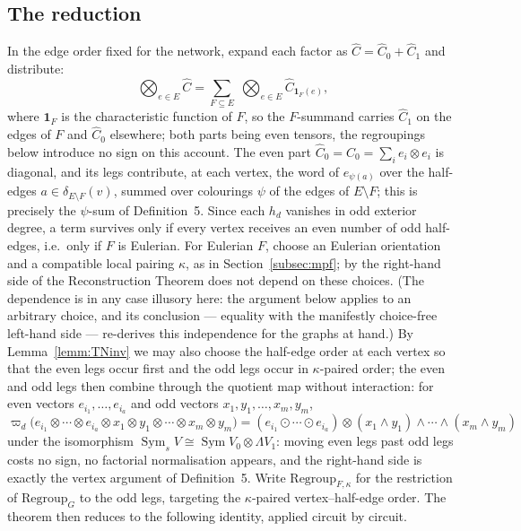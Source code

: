 \documentclass[11pt]{article}
\newcommand{\halfedges}[2]{\delta_{#1}(#2)}       %
\newcommand{\copair}{C}                           %
\newcommand{\twistedC}{\widehat{C}}               %
\newcommand{\symq}[1]{\varpi_{#1}}                %
\newcommand{\SymV}{\operatorname{Sym}}
\begin{document}
\subsection{The reduction}\label{subsec:reduction}

In the edge order fixed for the network, expand each factor as
$\twistedC=\twistedC_{0}+\twistedC_{1}$ and distribute:
\[
\bigotimes_{e\in E}\twistedC
=\sum_{F\subseteq E}\;
\bigotimes_{e\in E}\twistedC_{\mathbf{1}_{F}(e)},
\]
where $\mathbf{1}_{F}$ is the characteristic function of $F$, so
the $F$-summand carries $\twistedC_{1}$ on the edges of $F$ and
$\twistedC_{0}$ elsewhere; both parts being even tensors, the
regroupings below introduce no sign on this account.
The even part $\twistedC_{0}=\copair_{0}=\sum_{i}e_{i}\otimes
e_{i}$ is diagonal, and its legs contribute, at each vertex, the
word of $e_{\psi(a)}$ over the half-edges
$a\in\halfedges{E\setminus F}{v}$, summed over colourings $\psi$
of the edges of $E\setminus F$; this is precisely the
$\psi$-sum of Definition~5. Since each $h_{d}$ vanishes in odd
exterior degree, a term survives only if every vertex receives an
even number of odd half-edges, i.e.\ only if $F$ is Eulerian.
For Eulerian $F$, choose an Eulerian orientation and a compatible
local pairing $\kappa$, as in
Section~\ref{subsec:mpf}; by \cite[Proposition~3]{RS21} the
right-hand side of the Reconstruction Theorem does not depend on
these choices. (The dependence is in any case illusory here: the
argument below applies to an arbitrary choice, and its conclusion
--- equality with the manifestly choice-free left-hand side ---
re-derives this independence for the graphs at hand.) By Lemma~\ref{lemm:TNinv} we may also choose the
half-edge order at each vertex so that the even legs occur first
and the odd legs occur in $\kappa$-paired order; the even and odd
legs then combine through the quotient map without interaction:
for even vectors $e_{i_{1}},\dotsc,e_{i_{a}}$ and odd vectors
$x_{1},y_{1},\dotsc,x_{m},y_{m}$,
\begin{equation}\label{eq:mixedquotient}
\symq{d}\bigl(e_{i_{1}}\otimes\dotsb\otimes e_{i_{a}}
\otimes x_{1}\otimes y_{1}\otimes\dotsb\otimes x_{m}\otimes
y_{m}\bigr)
=(e_{i_{1}}\odot\dotsb\odot e_{i_{a}})\otimes
(x_{1}\wedge y_{1})\wedge\dotsb\wedge(x_{m}\wedge y_{m})
\end{equation}
under the isomorphism
$\SymV_{s}V\cong\SymV V_{0}\otimes\Lambda V_{1}$: moving even legs
past odd legs costs no sign, no factorial normalisation appears,
and the right-hand side is exactly the vertex argument of
Definition~5. Write $\mathrm{Regroup}_{F,\kappa}$ for the
restriction of $\mathrm{Regroup}_{G}$ to the odd legs, targeting
the $\kappa$-paired vertex--half-edge order. The theorem then
reduces to the following identity, applied circuit by circuit.
\end{document}
